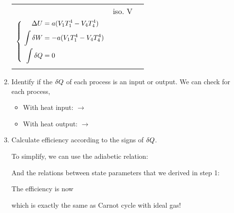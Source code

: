 \documentclass[class=article, crop=false, 12pt]{standalone}
\begin{document}
\begin{example}
\begin{enumerate}
\begin{center}
\begin{tabular}{>{\centering\arraybackslash}m{2cm} 
            >{\centering\arraybackslash}m{2.5cm} 
            c}
            & iso. V
            & \makecell[l]{
                \phantom{\scriptsize abc}\\
                $\left\{ \ \begin{aligned} 
                    \Delta U &= a(V_1T_1^4-V_4T_4^4)\\
                    \int \var{W} &= -a(V_1T_1^4-V_4T_4^4)\\
                    \int \var{Q} &= 0\\
                 \end{aligned}\right.$\\
                \phantom{\scriptsize abc}
            }
        \end{tabular}
    \end{center}

    \item Identify if the $\var{Q}$ of each process is an input or output.
    We can check for each process,
    \begin{itemize}
        \item With heat input:  $\rightarrow$ 
        \item With heat output:  $\rightarrow$ 
    \end{itemize}


    \item Calculate efficiency according to the signs of $\var{Q}$.

    To simplify, we can use the adiabetic relation:

    And the relations between state parameters that we derived in step 1:

    The efficiency is now

    which is exactly the same as Carnot cycle with ideal gas!

    \end{enumerate}

\end{example}




\theend
\end{document}
